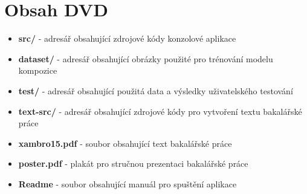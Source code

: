 
\chapter{Obsah DVD}
\begin{itemize}
\item \textbf{src/} - adresář obsahující zdrojové kódy konzolové aplikace
\item \textbf{dataset/} - adresář obsahující obrázky použité pro trénování modelu kompozice
\item \textbf{test/} - adresář obsahující použitá data a výsledky uživatelského testování
\item \textbf{text-src/} - adresář obsahující zdrojové kódy pro vytvoření textu bakalářské práce
\item \textbf{xambro15.pdf} - soubor obsahující text bakalářské práce
\item \textbf{poster.pdf} - plakát pro stručnou prezentaci bakalářské práce
\item \textbf{Readme} - soubor obsahující manuál pro spuštění aplikace
\end{itemize}





